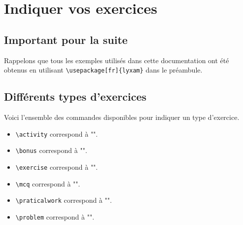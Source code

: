 \documentclass[12pt,a4paper]{scrartcl}
\makeatletter
\theoremstyle{definition}
\newcommand\@IDoptarg{\@ifstar{\@IDoptargStar}{\@IDoptargNoStar}}
\newcommand\@IDoptargStar[2]{%
	\vspace{0.5em}
	--- \texttt{#1%
		\IfStrEq{#2}{}{:}{\,#2:}%
	}%
}
\newcommand\@IDoptargNoStar[2]{%
	\IfStrEq{#2}{}{%
		\@IDoptargStar{#1}{}%
	}{%
		\@IDoptargStar{#1}{\##2}%
	}%
}
\newcommand\IDkey[1]{%
	\@IDoptarg*{Option}{{\itshape "#1"}}%
}
\makeatother
\begin{document}
\newcommand\exosoptions{
\IDkey{pts} le nombre de points avec le cas particulier de $0$ qui demande d'afficher "Non noté".

\IDkey{time} la durée de l'exercice.

\IDkey{id} un texte de votre choix pour remplacer le numéro (ceci a pour effet de bloquer temporairement la numérotation).

\IDkey{title} un titre.

\IDkey{about} une petite indication liée à l'exercice (comme par exemple qu'il ne s'adresse qu'aux élèves motivés).

\IDkey{src} la source utilisée pour confectionner l'exercice.
}


\section{Indiquer vos exercices}

    \subsection{Important pour la suite}


Rappelons que tous les exemples utilisés dans cette documentation ont été obtenus en utilisant \verb+\usepackage[fr]{lyxam}+ dans le préambule.


    \subsection{Différents types d'exercices}

Voici l'ensemble des commandes disponibles pour indiquer un type d'exercice.

\begin{itemize}[label=\textbullet]
\makeatletter
    \item \verb+\activity+ correspond à "\lyxam@text@activity{}".
    
    \item \verb+\bonus+ correspond à "\lyxam@text@bonus{}".
    
    \item \verb+\exercise+ correspond à "\lyxam@text@exercise{}".
    
    \item \verb+\mcq+ correspond à "\lyxam@text@mcq{}".
    
    \item \verb+\praticalwork+ correspond à "\lyxam@text@praticalwork{}".
    
    \item \verb+\problem+ correspond à "\lyxam@text@problem{}".
\makeatother
\end{itemize}
\end{document}

